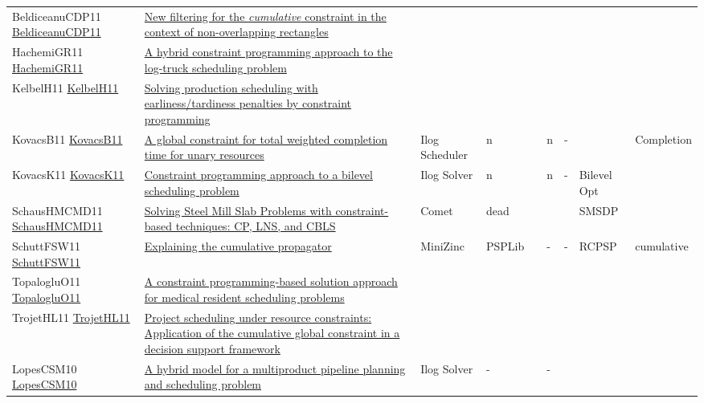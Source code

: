 {\begin{longtable}{p{3cm}p{7cm}lllllll}
BeldiceanuCDP11 \href{https://doi.org/10.1007/s10479-010-0731-0}{BeldiceanuCDP11} &  \href{articles/BeldiceanuCDP11.pdf}{New filtering for the \emph{cumulative} constraint in the context of non-overlapping rectangles} &  &  &  &  &  &  & \\
HachemiGR11 \href{https://doi.org/10.1007/s10479-010-0698-x}{HachemiGR11} &  \href{articles/HachemiGR11.pdf}{A hybrid constraint programming approach to the log-truck scheduling problem} &  &  &  &  &  &  & \\
KelbelH11 \href{https://doi.org/10.1007/s10845-009-0318-2}{KelbelH11} &  \href{articles/KelbelH11.pdf}{Solving production scheduling with earliness/tardiness penalties by constraint programming} &  &  &  &  &  &  & \\
KovacsB11 \href{https://doi.org/10.1007/s10601-009-9088-x}{KovacsB11} &  \href{articles/KovacsB11.pdf}{A global constraint for total weighted completion time for unary resources} & Ilog Scheduler & n &  & n & - &  & Completion\\
KovacsK11 \href{https://doi.org/10.1007/s10601-010-9102-3}{KovacsK11} &  \href{articles/KovacsK11.pdf}{Constraint programming approach to a bilevel scheduling problem} & Ilog Solver & n &  & n & - & Bilevel Opt & \\
SchausHMCMD11 \href{https://doi.org/10.1007/s10601-010-9100-5}{SchausHMCMD11} &  \href{articles/SchausHMCMD11.pdf}{Solving Steel Mill Slab Problems with constraint-based techniques: CP, LNS, and {CBLS}} & Comet & dead &  &  &  & SMSDP & \\
SchuttFSW11 \href{https://doi.org/10.1007/s10601-010-9103-2}{SchuttFSW11} &  \href{articles/SchuttFSW11.pdf}{Explaining the cumulative propagator} & MiniZinc & PSPLib &  & - & - & RCPSP & cumulative\\
TopalogluO11 \href{https://doi.org/10.1016/j.cor.2010.04.018}{TopalogluO11} &  \href{articles/TopalogluO11.pdf}{A constraint programming-based solution approach for medical resident scheduling problems} &  &  &  &  &  &  & \\
TrojetHL11 \href{https://doi.org/10.1016/j.cie.2010.08.014}{TrojetHL11} &  \href{articles/TrojetHL11.pdf}{Project scheduling under resource constraints: Application of the cumulative global constraint in a decision support framework} &  &  &  &  &  &  & \\
LopesCSM10 \href{https://doi.org/10.1007/s10601-009-9086-z}{LopesCSM10} &  \href{articles/LopesCSM10.pdf}{A hybrid model for a multiproduct pipeline planning and scheduling problem} & Ilog Solver & - &  & - & \cite{MouraSCL08,MouraSCL08a} &  & \\

\end{longtable}}
